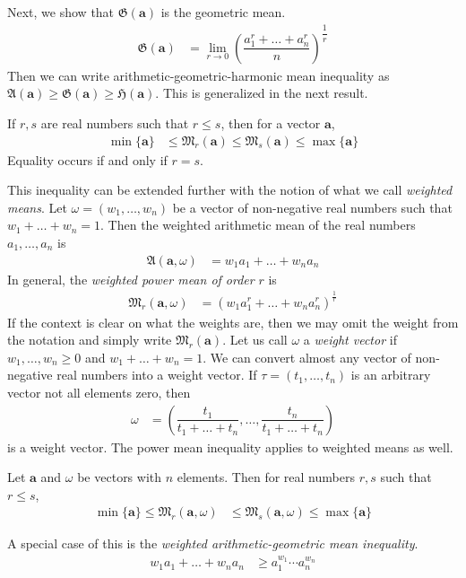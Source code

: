 \documentclass{subfile}
\begin{document}
	Next, we show that $\mathfrak{G}(\mathbf{a})$ is the geometric mean.
		\begin{align*}
			\mathfrak{G}(\mathbf{a})
				& = \lim\limits_{r\to0}\left(\dfrac{a_{1}^{r}+\ldots+a_{n}^{r}}{n}\right)^{\dfrac{1}{r}}
		\end{align*}
	Then we can write arithmetic-geometric-harmonic mean inequality as $\mathfrak{A}(\mathbf{a})\geq\mathfrak{G}(\mathbf{a})\geq \mathfrak{H}(\mathbf{a})$. This is generalized in the next result.
		\begin{theorem}
			If $r,s$ are real numbers such that $r\leq s$, then for a vector $\mathbf{a}$,
				\begin{align*}
					\min\{\mathbf{a}\}
						& \leq \mathfrak{M}_{r}(\mathbf{a})\leq \mathfrak{M}_{s}(\mathbf{a})\leq\max\{\mathbf{a}\}
				\end{align*}
			Equality occurs if and only if $r=s$.
		\end{theorem}
	This inequality can be extended further with the notion of what we call \textit{weighted means}. Let $\omega=(w_{1},\ldots,w_{n})$ be a vector of non-negative real numbers such that $w_{1}+\ldots+w_{n}=1$. Then the weighted arithmetic mean of the real numbers $a_{1},\ldots,a_{n}$ is
		\begin{align*}
			\mathfrak{A}(\mathbf{a},\omega)
				& = w_{1}a_{1}+\ldots+w_{n}a_{n}
		\end{align*}
	In general, the \textit{weighted power mean of order} $r$ is
		\begin{align*}
			\mathfrak{M}_{r}(\mathbf{a},\omega)
				& = \left(w_{1}a_{1}^{r}+\ldots+w_{n}a_{n}^{r}\right)^{\frac{1}{r}}
		\end{align*}
	If the context is clear on what the weights are, then we may omit the weight from the notation and simply write $\mathfrak{M}_{r}(\mathbf{a})$. Let us call $\omega$ a \textit{weight vector} if $w_{1},\ldots,w_{n}\geq 0$ and $w_{1}+\ldots+w_{n}=1$. We can convert almost any vector of non-negative real numbers into a weight vector. If $\tau=(t_{1},\ldots,t_{n})$ is an arbitrary vector not all elements zero, then
		\begin{align*}
			\omega
				& = \left(\dfrac{t_{1}}{t_{1}+\ldots+t_{n}},\ldots,\dfrac{t_{n}}{t_{1}+\ldots+t_{n}}\right)
		\end{align*}
	is a weight vector. The power mean inequality applies to weighted means as well.
		\begin{theorem}\label{thm:weightedpowermean}
			Let $\mathbf{a}$ and $\omega$ be vectors with $n$ elements. Then for real numbers $r,s$ such that $r\leq s$,
				\begin{align*}
					\min\{\mathbf{a}\} \leq \mathfrak{M}_{r}(\mathbf{a},\omega)
						& \leq \mathfrak{M}_{s}(\mathbf{a},\omega)\leq \max\{\mathbf{a}\}
				\end{align*}
		\end{theorem}
	A special case of this is the \textit{weighted arithmetic-geometric mean inequality}.
		\begin{align}
			w_{1}a_{1}+\ldots+w_{n}a_{n}
				& \geq a_{1}^{w_{1}}\cdots a_{n}^{w_{n}}\label{eqn:weightedamgm}
		\end{align}
\end{document}
